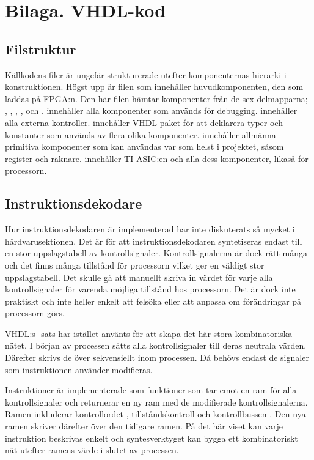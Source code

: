 \documentclass[main.tex]{subfiles}
\begin{document}
\section{Bilaga. VHDL-kod}

\subsection{Filstruktur}
Källkodens filer är ungefär strukturerade utefter komponenternas hierarki i
konstruktionen. Högst upp är filen  som innehåller
huvudkomponenten, den som laddas på FPGA:n. Den här filen hämtar komponenter
från de sex delmapparna; , , , ,
 och .  innehåller alla komponenter som används
för debugging.  innehåller alla externa kontroller. 
innehåller VHDL-paket för att deklarera typer och konstanter som används av
flera olika komponenter.  innehåller allmänna primitiva komponenter
som kan användas var som helst i projektet, såsom register och räknare.
 innehåller TI-ASIC:en och alla dess komponenter,  likaså
för processorn.

\subsection{Instruktionsdekodare}
Hur instruktionsdekodaren är implementerad har inte diskuterats så mycket i
hårdvaru\-sektionen. Det är för att instruktionsdekodaren syntetiseras endast
till en stor uppslagstabell av kontrollsignaler. Kontrollsignalerna är dock
rätt många och det finns många tillstånd för processorn vilket ger en väldigt
stor uppslagstabell. Det skulle gå att manuellt skriva in värdet för varje alla
kontrollsignaler för varenda möjliga tillstånd hos processorn. Det är dock inte
praktiskt och inte heller enkelt att felsöka eller att anpassa om förändringar
på processorn görs.

VHDL:s -sats har istället använts för att skapa det här stora
kombinatoriska nätet. I början av processen sätts alla kontrollsignaler till
deras neutrala värden. Därefter skrivs de över sekvensiellt inom processen. Då
behövs endast de signaler som instruktionen använder modifieras.

Instruktioner är implementerade som funktioner som tar emot en ram  för
alla kontrollsignaler och returnerar en ny ram med de modifierade
kontrollsignalerna. Ramen inkluderar kontrollordet ,
tillståndskontroll  och kontrollbussen . Den nya ramen
skriver därefter över den tidigare ramen. På det här viset kan varje
instruktion beskrivas enkelt och syntesverktyget kan bygga ett kombinatoriskt
nät utefter ramens värde i slutet av processen.
\end{document}
